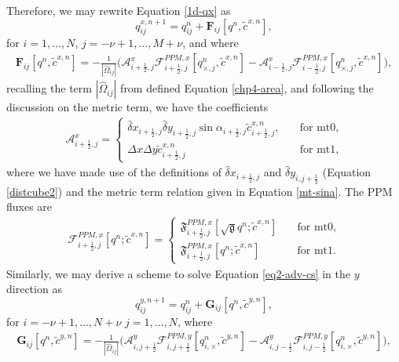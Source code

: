 Therefore, we may rewrite Equation \eqref{1d-qx} as
\begin{equation}
q^{x,n+1}_{ij} = q^{n}_{ij} + \mathbf{F}_{ij}[{q^n,\tilde{c}^{x,n}}],
\end{equation}
for $i=1, \ldots, N$, $j=-\nu+1, \ldots, M + \nu$, and where
\begin{align*}
	\mathbf{F}_{ij}[{q^n,\tilde{c}^{x,n}}] = 
	-\frac{1}{|\hat{\Omega}_{ij}|}
	\bigg(\mathcal{A}_{i+\frac{1}{2},j}^{x} \mathcal{F}_{i+\frac{1}{2},j}^{PPM,x}[q^n_{\times,j},\tilde{c}^{x,n}]-
	\mathcal{A}_{i-\frac{1}{2},j}^{x} \mathcal{F}_{i-\frac{1}{2},j}^{PPM,x}[q^n_{\times,j},\tilde{c}^{x,n}] \bigg),
\end{align*}
recalling the term $|\hat{\Omega}_{ij}|$ from defined Equation \eqref{chp4-area},
and following the discussion on the metric term, we have the coefficients
\begin{align}
	\label{ax-def}
	\mathcal{A}_{i+\frac{1}{2},j}^x= 
	\begin{cases}
		\hat{\delta} x_{i+\frac{1}{2},j}  \hat{\delta} y_{i+\frac{1}{2},j} 
		\sin{\alpha_{i+\frac{1}{2},j}}
		{\tilde{c}}_{i+\frac{1}{2},j}^{x,n},
		\quad &\text{for mt0},\\
		{\Delta x}{\Delta y}{\tilde{c}}_{i+\frac{1}{2},j}^{x,n}
		\quad &\text{for mt1},
	\end{cases}
\end{align}
where we have made use of the definitions of 
$\hat{\delta} x_{i+\frac{1}{2},j}$ and $\hat{\delta} y_{i,j+\frac{1}{2}}$ (Equation \eqref{distcube2}) and the metric term relation given in Equation \eqref{mt-sina}.
The PPM fluxes are
\begin{align}
	\label{ppmx-flux}
	\mathcal{F}_{i+\frac{1}{2},j}^{PPM,x} [{{q}^n;\tilde{c}^{x,n}}] = 
	\begin{cases}
		\mathfrak{F}_{i+\frac{1}{2},j}^{PPM,x}[{{\sqrt{\mathfrak{g}}q}^n;\tilde{c}^{x,n}}]
		\quad &\text{for mt0},\\
		\mathfrak{F}_{i+\frac{1}{2},j}^{PPM,x}[{{q}^n;\tilde{c}^{x,n}}]
		\quad &\text{for mt1}.
	\end{cases}
\end{align}
Similarly, we may derive a scheme to solve Equation \eqref{eq2-adv-cs} in the $y$ direction as
\begin{equation}
	q^{y,n+1}_{ij} = q^{n}_{ij} + \mathbf{G}_{ij}[{q^n,\tilde{c}^{y,n}}],
\end{equation}
for $i=-\nu+1, \ldots, N + \nu$  $j=1, \ldots, N$, where
\begin{align*}
	\mathbf{G}_{ij}[{q^n,\tilde{c}^{y,n}}] = 
	-\frac{1}{|\hat{\Omega}_{ij}|}
	\bigg(\mathcal{A}_{i,j+\frac{1}{2}}^{y} \mathcal{F}_{i,j+\frac{1}{2}}^{PPM,y}[q^n_{i,\times},\tilde{c}^{y,n}]-
	\mathcal{A}_{i,j-\frac{1}{2}}^{y} \mathcal{F}_{i,j-\frac{1}{2}}^{PPM,y}[q^n_{i,\times},\tilde{c}^{y,n}] \bigg),
\end{align*}
